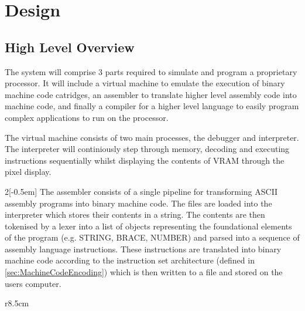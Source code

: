 \section{Design}

\subsection{High Level Overview}

The system will comprise 3 parts required to simulate and program a proprietary processor. It will include a virtual machine to emulate the execution of binary machine code catridges, an assembler to translate higher level assembly code into machine code, and finally a compiler for a higher level language to easily program complex applications to run on the processor.

The virtual machine consists of two main processes, the debugger and interpreter. The interpreter will continiously step through memory, decoding and executing instructions sequentially whilst displaying the contents of VRAM through the pixel display.

\bigskip


\bigskip

\begin{multicols}{2}[\columnsep-0.5em] 
    The assembler consists of a single pipeline for transforming ASCII assembly programs into binary machine code. The files are loaded into the interpreter which stores their contents in a string. The contents are then tokenised by a lexer into a list of objects representing the foundational elements of the program (e.g. STRING, BRACE, NUMBER) and parsed into a sequence of assembly language instructions. These instructions are translated into binary machine code according to the instruction set architecture (defined in \ref{sec:MachineCodeEncoding}) which is then written to a file and stored on the users computer.


    \columnbreak


\end{multicols}


\begin{wrapfigure}[13]{r}{8.5cm}
\end{wrapfigure}

